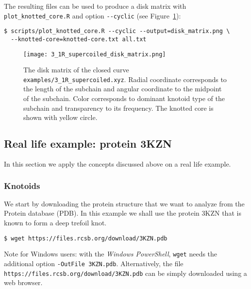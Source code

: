 The resulting files can be used to produce a disk matrix\cite{rawdon} 
with \lstinline{plot_knotted_core.R} and option \lstinline{--cyclic} (see Figure~\ref{fig:3_1R_supercoiled:disk}):
\begin{lstlisting}
$ scripts/plot_knotted_core.R --cyclic --output=disk_matrix.png \
  --knotted-core=knotted-core.txt all.txt
\end{lstlisting}
\begin{figure}[t]
\centering
\texttt{[image: 3\_1R\_supercoiled\_disk\_matrix.png]}
\caption{ The disk matrix of the closed curve \lstinline{examples/3_1R_supercoiled.xyz}. Radial coordinate corresponds to the length of the subchain and angular coordinate to the midpoint of the subchain. Color corresponds to dominant knotoid type of the subchain and transparency to its frequency. The knotted core is shown with yellow circle.}\label{fig:3_1R_supercoiled:disk}
\end{figure}



\clearpage
\subsection{\label{sec:example}Real life example: protein 3KZN}
In this section we apply the concepts discussed above on a real life example.
\subsubsection{Knotoids}
We start by downloading the protein structure that we want to analyze from the Protein database (PDB)\cite{pdb}. In this example we shall use the protein 3KZN\cite{shi2006} that is known to form a deep trefoil knot.
\begin{lstlisting}
$ wget https://files.rcsb.org/download/3KZN.pdb
\end{lstlisting}
Note for Windows users: with the {\it Windows PowerShell}, \lstinline{wget} needs the additional option \lstinline{-OutFile 3KZN.pdb}. Alternatively, the file \lstinline{https://files.rcsb.org/download/3KZN.pdb} can be simply downloaded using a web browser.

